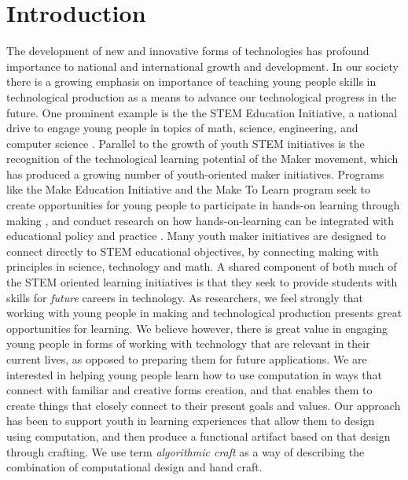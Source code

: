 \documentclass{sigchi}
\begin{document}


\section{Introduction}
The development of new and innovative forms of technologies has profound importance to national and international growth and development. In our society there is a growing emphasis on importance of teaching young people skills in technological production as a means to advance our technological progress in the future. One prominent example is the the STEM Education Initiative, a national drive to engage young people in topics of math, science, engineering, and computer science \cite{stemReport}. Parallel to the growth of youth STEM initiatives is the recognition of the technological learning potential of the Maker movement, which has produced a growing number of youth-oriented maker initiatives. Programs like the Make Education Initiative and the Make To Learn program seek to create opportunities for young people to participate in hands-on learning through making \cite{makerinitiatives}, and conduct research on how hands-on-learning can be integrated with educational policy and practice \cite{maketolearn}. Many youth maker initiatives are designed to connect directly to STEM educational objectives, by connecting making with principles in science, technology and math. A shared component of both much of the STEM oriented learning initiatives is that they seek to provide students with skills for \textit{future} careers in technology. As researchers, we feel strongly that working with young people in making and technological production presents great opportunities for learning. We believe however, there is great value in engaging young people in forms of working with technology that are relevant in their current lives, as opposed to preparing them for future applications. We are interested in helping young people learn how to use computation in ways that connect with familiar and creative forms creation, and that enables them to create things that closely connect to their present goals and values. Our approach has been to support youth in learning experiences that allow them to design using computation, and then produce a functional artifact based on that design through crafting. We use term \textit{algorithmic craft} as a way of describing the combination of computational design and hand craft.
\end{document}
